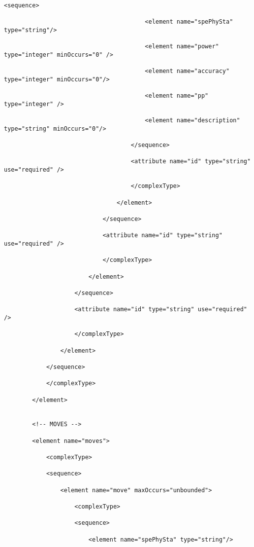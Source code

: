 \begin{lstlisting}[style=XML]
                                    <sequence>

                                        <element name="spePhySta" type="string"/>

                                        <element name="power" type="integer" minOccurs="0" />

                                        <element name="accuracy" type="integer" minOccurs="0"/>

                                        <element name="pp" type="integer" />

                                        <element name="description" type="string" minOccurs="0"/>

                                    </sequence>

                                    <attribute name="id" type="string" use="required" />

                                    </complexType>

                                </element>

                            </sequence>

                            <attribute name="id" type="string" use="required" />

                            </complexType>

                        </element>

                    </sequence>

                    <attribute name="id" type="string" use="required" />

                    </complexType>

                </element>

            </sequence>

            </complexType>

        </element>


        <!-- MOVES -->

        <element name="moves">

            <complexType>

            <sequence>

                <element name="move" maxOccurs="unbounded">

                    <complexType>

                    <sequence>

                        <element name="spePhySta" type="string"/>


\end{lstlisting}
